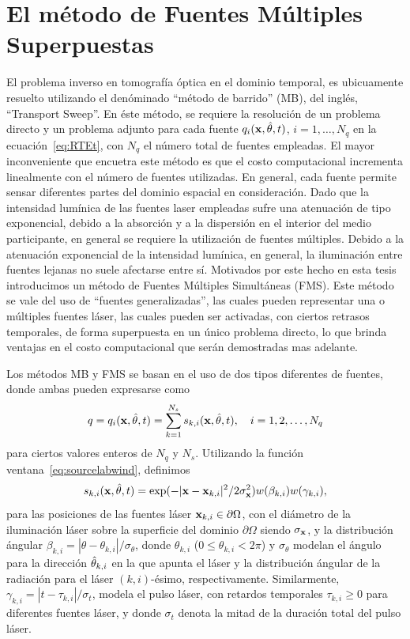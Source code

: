 \section{El método de Fuentes Múltiples Superpuestas}
\label{sec:FMS}
El problema inverso en tomografía óptica en el dominio temporal, es ubicuamente resuelto utilizando el denóminado ``método de barrido'' (MB), del inglés, ``Transport Sweep''. En éste método, se requiere la resolución de un problema directo y un problema adjunto 
para cada fuente $q_i(\mathbf{x},\hat{\theta},t)$, $i=1,\ldots,N_q$ en la ecuación~\eqref{eq:RTEt}, 
con $N_q$ el número total de fuentes empleadas. 
El mayor inconveniente que encuetra este método es que el costo computacional 
incrementa linealmente con el número de fuentes utilizadas. En general, 
cada fuente permite sensar diferentes partes del dominio espacial en consideración. 
Dado que la intensidad lumínica de las fuentes laser empleadas sufre una 
atenuación de tipo exponencial, debido a la absorción y a la dispersión 
en el interior del medio participante, en general se requiere la utilización de 
fuentes múltiples. Debido a la atenuación exponencial de la intensidad lumínica, 
en general, la iluminación entre fuentes lejanas no suele afectarse entre sí. 
Motivados por este hecho en esta tesis introducimos un método de Fuentes Múltiples 
Simultáneas (FMS). Este método se vale del uso de ``fuentes generalizadas'', 
las cuales pueden representar una o múltiples fuentes láser, las cuales 
pueden ser activadas, con ciertos retrasos temporales, de forma superpuesta 
en un único problema directo, lo que brinda ventajas en el costo computacional 
que serán demostradas mas adelante.  

Los métodos MB y FMS se basan en el uso de dos tipos diferentes de fuentes, 
donde ambas pueden expresarse como
\begin{equation}
  q = q_i(\mathbf{x},\hat{\theta},t) =\sum_{k=1}^{N_s} s_{k,i}(\mathbf{x},\hat{\theta},t) ,\quad i=1,2,\ldots,N_q
\label{eq:RTEsources}
\end{equation}
para ciertos valores enteros de $N_q$ y $N_s$. Utilizando la 
función ventana~\eqref{eq:sourcelabwind}, definimos
\begin{equation}
  s_{k,i}(\mathbf{x},\hat{\theta},t) = \exp(-|\mathbf{x}-\mathbf{x}_{k,i}|^2/
  2\sigma_{\mathbf{x}}^2)w(\beta_{k,i})w(\gamma_{k,i}),
\label{eq:RTEsources2}
\end{equation}
para las posiciones de las fuentes láser $\mathbf{x}_{k,i}\in\partial\Omega$, 
con el diámetro de la iluminación láser sobre la superficie del dominio $\partial \Omega$ 
siendo $\sigma_{\mathbf{x}}$, y la distribución 
ángular $\beta_{k,i}=|\theta-\theta_{k,i}|/\sigma_{\theta}$, 
donde $\theta_{k,i}$ ($0\leq \theta_{k,i} < 2\pi$) y $\sigma_{\theta}$
modelan el ángulo para la dirección $\hat{\theta}_{k,i}$ en la que apunta el láser 
y la distribución ángular de la radiación para el láser $(k,i)$-ésimo, respectivamente. 
Similarmente, $\gamma_{k,i}=|t-\tau_{k,i}|/\sigma_t$, modela el pulso 
láser, con retardos temporales $\tau_{k,i}\geq 0$ para diferentes fuentes láser, 
y donde $\sigma_t$ denota la mitad de la duración total del pulso láser. 

